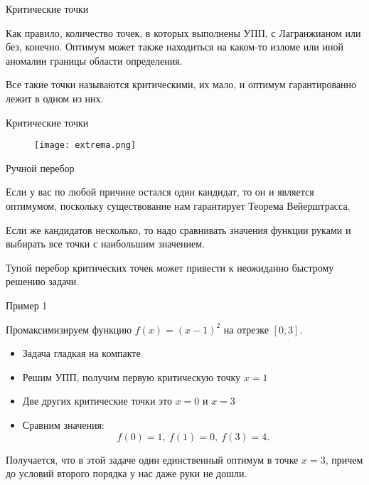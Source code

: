 \documentclass{beamer}
\begin{document}
\begin{frame}{Критические точки}

Как правило, количество точек, в которых выполнены УПП, с Лагранжианом или без,  конечно. Оптимум может также находиться на каком-то изломе или иной аномалии границы области определения.

Все такие точки называются \alert{критическими}, их мало, и оптимум гарантированно лежит в одном из них. 

\end{frame}

\begin{frame}{Критические точки}

\begin{figure}[hbt]
\centering
\texttt{[image: extrema.png]}
\end{figure}

\end{frame}

\begin{frame}{Ручной перебор}

Если у вас по любой причине остался один кандидат, то он и является оптимумом, поскольку существование нам гарантирует Теорема Вейерштрасса. 

Если же кандидатов несколько, то надо сравнивать значения функции руками и выбирать все точки с наибольшим значением. 

Тупой перебор критических точек может привести к неожиданно быстрому решению задачи.

\end{frame}

\begin{frame}{Пример 1}

Промаксимизируем функцию $f(x) = (x-1)^2$ на отрезке $[0,3]$.

\begin{itemize}
  \item Задача гладкая на компакте
  \item Решим УПП, получим первую критическую точку $x = 1$
  \item Две других критические точки это $x = 0$ и $x = 3$
  \item Сравним значения: $$f(0) = 1, \ f(1) = 0, \ f(3) = 4.$$
\end{itemize}

Получается, что в этой задаче один единственный оптимум в точке $x = 3$, причем до условий второго порядка у нас даже руки не дошли.

\end{frame}
\end{document}
